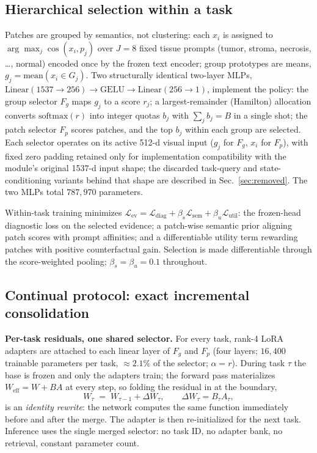 \documentclass{article}
\newcommand{\Fg}{F_{g}} \newcommand{\Fp}{F_{p}}
\begin{document}
\subsection{Hierarchical selection within a task}
\label{ssec:hier}
Patches are grouped by semantics, not clustering: each $x_i$ is assigned to $\arg\max_j \cos(x_i, p_j)$ over $J{=}8$ fixed tissue prompts (tumor, stroma, necrosis, \dots, normal) encoded once by the frozen text encoder; group prototypes are means, $g_j = \mathrm{mean}(x_i \in G_j)$. Two structurally identical two-layer MLPs, $\mathrm{Linear}(1537{\to}256)\to\mathrm{GELU}\to\mathrm{Linear}(256{\to}1)$, implement the policy: the group selector $\Fg$ maps $g_j$ to a score $r_j$; a largest-remainder (Hamilton) allocation converts $\mathrm{softmax}(r)$ into integer quotas $b_j$ with $\sum_j b_j = B$ in a single shot; the patch selector $\Fp$ scores patches, and the top $b_j$ within each group are selected. Each selector operates on its active 512-d visual input ($g_j$ for $\Fg$, $x_i$ for $\Fp$), with fixed zero padding retained only for implementation compatibility with the module's original 1537-d input shape; the discarded task-query and state-conditioning variants behind that shape are described in Sec.~\ref{sec:removed}. The two MLPs total $787{,}970$ parameters.

Within-task training minimizes $\mathcal{L}_{\mathrm{ev}} = \mathcal{L}_{\mathrm{diag}} + \beta_s\mathcal{L}_{\mathrm{sem}} + \beta_u\mathcal{L}_{\mathrm{util}}$: the frozen-head diagnostic loss on the selected evidence; a patch-wise semantic prior aligning patch scores with prompt affinities; and a differentiable utility term rewarding patches with positive counterfactual gain. Selection is made differentiable through the score-weighted pooling; $\beta_s=\beta_u=0.1$ throughout.

\subsection{Continual protocol: exact incremental consolidation}
\label{ssec:cl}
\textbf{Per-task residuals, one shared selector.} For every task, rank-4 LoRA adapters \cite{hu2022lora} are attached to each linear layer of $\Fg$ and $\Fp$ (four layers; $16{,}400$ trainable parameters per task, ${\approx}2.1\%$ of the selector; $\alpha{=}r$). During task $\tau$ the base is frozen and only the adapters train; the forward pass materializes $W_{\mathrm{eff}} = W + BA$ at every step, so folding the residual in at the boundary,
\begin{equation}
W_\tau \;=\; W_{\tau-1} + \Delta W_\tau,\qquad \Delta W_\tau = B_\tau A_\tau,
\end{equation}
is an \emph{identity rewrite}: the network computes the same function immediately before and after the merge. The adapter is then re-initialized for the next task. Inference uses the single merged selector: no task ID, no adapter bank, no retrieval, constant parameter count.
\end{document}
